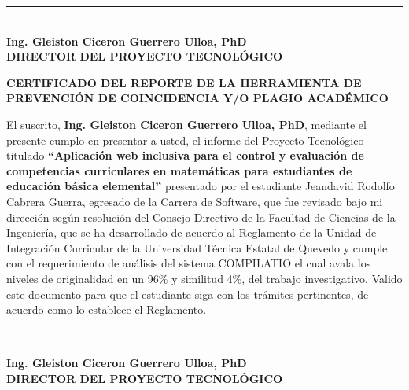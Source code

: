 \documentclass[12pt,a4paper,oneside]{report}
\begin{document}
\vspace{4cm}

\begin{center}
    \rule{8cm}{0.4pt}\\[0.2cm]
    \textbf{Ing. Gleiston Ciceron Guerrero Ulloa, PhD}\\
    \textbf{DIRECTOR DEL PROYECTO TECNOLÓGICO}
\end{center}

\newpage

\begin{center}
    \vspace*{0.5cm}
    \begin{minipage}{0.95\textwidth}
        \centering
        \textbf{CERTIFICADO DEL REPORTE DE LA HERRAMIENTA DE PREVENCIÓN DE COINCIDENCIA Y/O PLAGIO ACADÉMICO}
    \end{minipage}
\end{center}
\vspace{1cm}

\justifying
El suscrito, \textbf{Ing. Gleiston Ciceron Guerrero Ulloa, PhD}, mediante el presente cumplo en presentar a usted, el informe del Proyecto Tecnológico titulado \textbf{``Aplicación web inclusiva para el control y evaluación de competencias curriculares en matemáticas para estudiantes de educación básica elemental''} presentado por el estudiante Jeandavid Rodolfo Cabrera Guerra, egresado de la Carrera de Software, que fue revisado bajo mi dirección según resolución del Consejo Directivo de la Facultad de Ciencias de la Ingeniería, que se ha desarrollado de acuerdo al Reglamento de la Unidad de Integración Curricular de la Universidad Técnica Estatal de Quevedo y cumple con el requerimiento de análisis del sistema COMPILATIO el cual avala los niveles de originalidad en un 96\% y similitud 4\%, del trabajo investigativo. Valido este documento para que el estudiante siga con los trámites pertinentes, de acuerdo como lo establece el Reglamento.

\vspace{3cm}

\begin{center}
    \rule{8cm}{0.4pt}\\[0.2cm]
    \textbf{Ing. Gleiston Ciceron Guerrero Ulloa, PhD}\\
    \textbf{DIRECTOR DEL PROYECTO TECNOLÓGICO}
\end{center}
\end{document}
